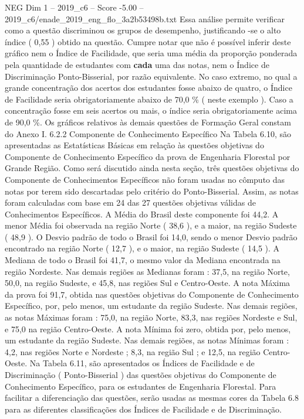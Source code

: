\begin{textsample}{NEG Dim 1 – 2019\_c6 – Score -5.00 – 2019\_c6/enade\_2019\_eng\_flo\_3a2b53498b.txt}
Essa análise permite verificar como a questão discriminou os grupos de desempenho, justificando -se o alto índice ( 0,55 ) obtido na questão.
Cumpre notar que não é possível inferir deste gráfico nem o Índice de Facilidade, que seria uma média da proporção ponderada pela quantidade de estudantes com \textbf{cada} uma das notas, nem o Índice de Discriminação Ponto-Bisserial, por razão equivalente.
No caso extremo, no qual a grande concentração dos acertos dos estudantes fosse abaixo de quatro, o Índice de Facilidade seria obrigatoriamente abaixo de 70,0 \% ( neste exemplo ).
Caso a concentração fosse em seis acertos ou mais, o índice seria obrigatoriamente acima de 90,0 \%.
Os gráficos relativos às demais questões de Formação Geral constam do Anexo I. 6.2.2 Componente de Conhecimento Específico Na Tabela 6.10, são apresentadas as Estatísticas Básicas em relação às questões objetivas do Componente de Conhecimento Específico da prova de Engenharia Florestal por Grande Região.
Como será discutido ainda nesta seção, três questões objetivas do Componente de Conhecimentos Específicos não foram usadas no cômputo das notas por terem sido descartadas pelo critério do Ponto-Bisserial.
Assim, as notas foram calculadas com base em 24 das 27 questões objetivas válidas de Conhecimentos Específicos.
A Média do Brasil deste componente foi 44,2.
A menor Média foi observada na região Norte ( 38,6 ), e a maior, na região Sudeste ( 48,9 ).
O Desvio padrão de todo o Brasil foi 14,0, sendo o menor Desvio padrão encontrado na região Norte ( 12,7 ), e o maior, na região Sudeste ( 14,5 ).
A Mediana de todo o Brasil foi 41,7, o mesmo valor da Mediana encontrada na região Nordeste.
Nas demais regiões as Medianas foram : 37,5, na região Norte, 50,0, na região Sudeste, e 45,8, nas regiões Sul e Centro-Oeste.
A nota Máxima da prova foi 91,7, obtida nas questões objetivas do Componente de Conhecimento Específico, por, pelo menos, um estudante da região Sudeste.
Nas demais regiões, as notas Máximas foram : 75,0, na região Norte, 83,3, nas regiões Nordeste e Sul, e 75,0 na região Centro-Oeste.
A nota Mínima foi zero, obtida por, pelo menos, um estudante da região Sudeste.
Nas demais regiões, as notas Mínimas foram : 4,2, nas regiões Norte e Nordeste ; 8,3, na região Sul ; e 12,5, na região Centro-Oeste.
Na Tabela 6.11, são apresentados os Índices de Facilidade e de Discriminação ( Ponto-Bisserial ) das questões objetivas do Componente de Conhecimento Específico, para os estudantes de Engenharia Florestal.
Para facilitar a diferenciação das questões, serão usadas as mesmas cores da Tabela 6.8 para as diferentes classificações dos Índices de Facilidade e de Discriminação.

\end{textsample}
